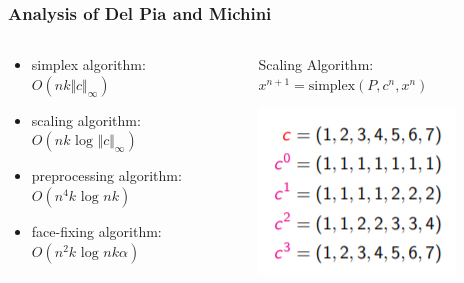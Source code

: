 \documentclass{beamer}
\begin{document}
\begin{frame}
	\frametitle{Analysis of Del Pia and Michini}
	\begin{columns}[T]
		\begin{column}{.5\textwidth}
			\begin{itemize}
				\item simplex algorithm: \\
				$O(nk \Vert c \Vert_\infty)$
				\item scaling algorithm: \\
				$O(nk \text{ log } \Vert c \Vert_\infty)$
				\item preprocessing algorithm: \\
				$O(n^4k \text{ log } nk)$
				\item face-fixing algorithm: \\
				$O(n^2k \text{ log } nk\alpha)$
			\end{itemize}
		\end{column}
		\begin{column}{.5\textwidth}
			Scaling Algorithm: \\
			$x^{n+1} = \text{simplex}(P, c^n, x^n)$ \\
			\begin{center}
				\includegraphics[]{scaling.png}
			\end{center}
		\end{column}
	\end{columns}
\end{frame}
\end{document}
